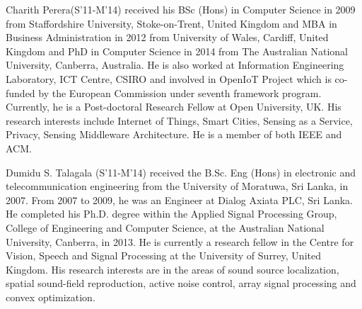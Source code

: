 \documentclass[journal]{IEEEtran}
\begin{document}
\begin{IEEEbiography}{Charith Perera}(S'11-M'14)
received his BSc (Hons) in Computer Science in 2009 from Staffordshire University, Stoke-on-Trent, United Kingdom and MBA in Business Administration in 2012 from University of Wales, Cardiff, United Kingdom and PhD in Computer Science in 2014 from The Australian National University, Canberra, Australia. He is also worked at Information Engineering Laboratory, ICT Centre, CSIRO and involved in OpenIoT Project  which is co-funded by the European Commission under seventh framework program. Currently, he is a Post-doctoral Research Fellow at Open University, UK. His research interests include Internet of Things, Smart Cities, Sensing as a Service, Privacy, Sensing Middleware Architecture. He is a member of both IEEE and ACM.


\end{IEEEbiography}


\vspace{-30pt}

\begin{IEEEbiography}{Dumidu S. Talagala}
 (S'11-M'14) received the B.Sc. Eng (Hons) in electronic and telecommunication engineering from the University of Moratuwa, Sri Lanka, in 2007. From 2007 to 2009, he was an Engineer at Dialog Axiata PLC, Sri Lanka. He completed his Ph.D. degree within the Applied Signal Processing Group, College of Engineering and Computer Science, at the Australian National University, Canberra, in 2013. He is currently a research fellow in the Centre for Vision, Speech and Signal Processing at the University of Surrey, United Kingdom. His research interests are in the areas of sound source localization, spatial sound-field reproduction, active noise control, array signal processing and convex optimization.


\end{IEEEbiography}





\vspace{-30pt}
\end{document}
